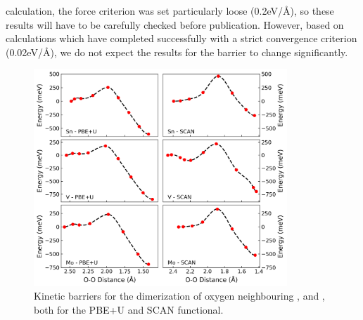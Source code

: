 \begin{refsection}
calculation, the force criterion was set particularly loose 
(0.2\si{\electronvolt/\AA}), so these results will have to be carefully 
checked before publication. However, based on calculations which have 
completed successfully with a strict convergence criterion 
(0.02\si{\electronvolt/\AA}), we do not expect the results for the barrier to 
change significantly.  
 
\begin{figure}[h] 
\centering 

\includegraphics[width=0.85\textwidth]{figures/batteries/substitution_dimers.png} 
\caption{Kinetic barriers for the dimerization of oxygen neighbouring , 
 and , both for the PBE+U and SCAN functional. } 
\label{batteries:fig-substitution_dimers} 
\end{figure} 
 

\end{refsection}
